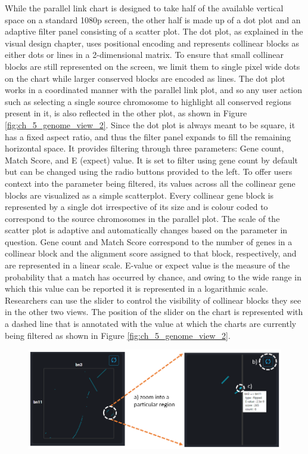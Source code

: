 While the parallel link chart is designed to take half of the available vertical space on a standard 1080p screen, the other half is made up of a dot plot and an adaptive filter panel consisting of a scatter plot. The dot plot, as explained in the visual design chapter, uses positional encoding and represents collinear blocks as either dots or lines in a 2-dimensional matrix. To ensure that small collinear blocks are still represented on the screen, we limit them to single pixel wide dots on the chart while larger conserved blocks are encoded as lines. The dot plot works in a coordinated manner with the parallel link plot, and so any user action such as selecting a single source chromosome to highlight all conserved regions present in it, is also reflected in the other plot, as shown in Figure \ref{fig:ch_5_genome_view_2}. Since the dot plot is always meant to be square, it has a fixed aspect ratio, and thus the filter panel expands to fill the remaining horizontal space. It provides filtering through three parameters: Gene count, Match Score, and E (expect) value. It is set to filter using gene count by default but can be changed using the radio buttons provided to the left. To offer users context into the parameter being filtered, its values across all the collinear gene blocks are visualized as a simple scatterplot. Every collinear gene block is represented by a single dot irrespective of its size and is colour coded to correspond to the source chromosomes in the parallel plot. The scale of the scatter plot is adaptive and automatically changes based on the parameter in question. Gene count and Match Score correspond to the number of genes in a collinear block and the alignment score assigned to that block, respectively, and are represented in a linear scale. E-value or expect value is the measure of the probability that a match has occurred by chance, and owing to the wide range in which this value can be reported it is represented in a logarithmic scale. Researchers can use the slider to control the visibility of collinear blocks they see in the other two views. The position of the slider on the chart is represented with a dashed line that is annotated with the value at which the charts are currently being filtered as shown in Figure \ref{fig:ch_5_genome_view_2}.


\begin{figure}[ht]
  \centering
  \includegraphics[width=.95\linewidth]{images/ch_5_chromosome_view.PNG}
  \label{fig:ch_5_chromosome_view}
\end{figure} 

